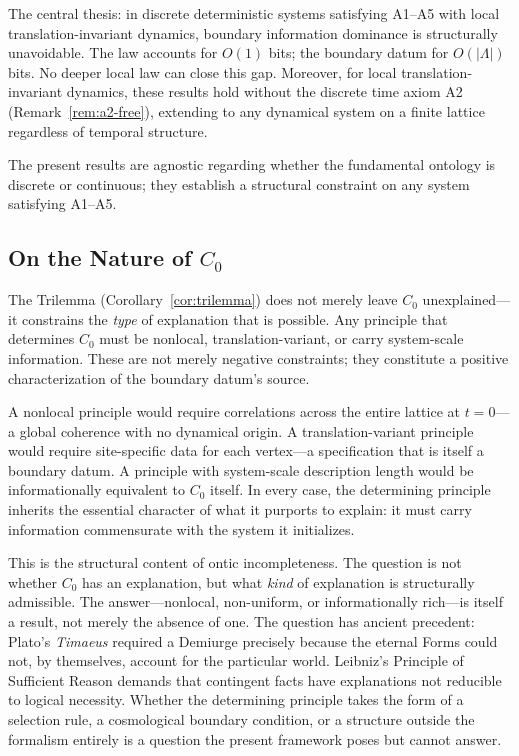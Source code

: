\documentclass[12pt]{article}
\theoremstyle{plain}
\theoremstyle{definition}
\theoremstyle{remark}
\newcommand{\Lattice}{\Lambda}
\begin{document}
The central thesis: in discrete deterministic systems satisfying A1--A5 with local translation-invariant dynamics, boundary information dominance is structurally unavoidable. The law accounts for $O(1)$ bits; the boundary datum for $O(|\Lattice|)$ bits. No deeper local law can close this gap. Moreover, for local translation-invariant dynamics, these results hold without the discrete time axiom A2 (Remark~\ref{rem:a2-free}), extending to any dynamical system on a finite lattice regardless of temporal structure.

The present results are agnostic regarding whether the fundamental ontology is discrete or continuous; they establish a structural constraint on any system satisfying A1--A5.

\subsection{On the Nature of $C_0$}

The Trilemma (Corollary~\ref{cor:trilemma}) does not merely leave $C_0$ unexplained---it constrains the \emph{type} of explanation that is possible. Any principle that determines $C_0$ must be nonlocal, translation-variant, or carry system-scale information. These are not merely negative constraints; they constitute a positive characterization of the boundary datum's source.

A nonlocal principle would require correlations across the entire lattice at $t = 0$---a global coherence with no dynamical origin. A translation-variant principle would require site-specific data for each vertex---a specification that is itself a boundary datum. A principle with system-scale description length would be informationally equivalent to $C_0$ itself. In every case, the determining principle inherits the essential character of what it purports to explain: it must carry information commensurate with the system it initializes.

This is the structural content of ontic incompleteness. The question is not whether $C_0$ has an explanation, but what \emph{kind} of explanation is structurally admissible. The answer---nonlocal, non-uniform, or informationally rich---is itself a result, not merely the absence of one. The question has ancient precedent: Plato's \emph{Timaeus} \cite{plato_timaeus} required a Demiurge precisely because the eternal Forms could not, by themselves, account for the particular world. Leibniz's Principle of Sufficient Reason \cite{leibniz1714} demands that contingent facts have explanations not reducible to logical necessity. Whether the determining principle takes the form of a selection rule, a cosmological boundary condition, or a structure outside the formalism entirely is a question the present framework poses but cannot answer.
\end{document}
